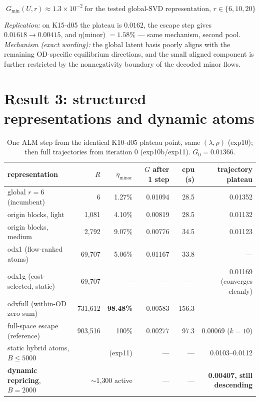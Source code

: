\documentclass[11pt]{article}
\begin{document}
\begin{equation}
\boxed{\;G_{\min}(U,r)\approx1.3\times10^{-2}\ \text{for the tested global-SVD
representation, }r\in\{6,10,20\}\;}
\label{eq:floor}
\end{equation}

\noindent\emph{Replication:} on K15-d05 the plateau is $0.0162$, the escape step gives
$0.01618\to0.00415$, and $\eta$(minor) $=1.58\%$ --- same mechanism, second pool.
\emph{Mechanism (exact wording):} the global latent basis poorly aligns with the
remaining OD-specific equilibrium directions, and the small aligned component is further
restricted by the nonnegativity boundary of the decoded minor flows.

\section{Result 3: structured representations and dynamic atoms}\label{sec:atoms}

\begin{table}[h]\centering\small
\caption{One ALM step from the identical K10-d05 plateau point, same $(\lambda,\rho)$
(exp10); then full trajectories from iteration 0 (exp10b/exp11). $G_0=0.01366$.}
\begin{tabular}{lrrrrr}
\toprule
representation & $R$ & $\eta_{\text{minor}}$ & $G$ after 1 step & cpu (s) & trajectory plateau\\
\midrule
global $r{=}6$ (incumbent) & 6 & 1.27\% & 0.01094 & 28.5 & 0.01352\\
origin blocks, light & 1{,}081 & 4.10\% & 0.00819 & 28.5 & 0.01132\\
origin blocks, medium & 2{,}792 & 9.07\% & 0.00776 & 34.5 & 0.01123\\
odx1 (flow-ranked atoms) & 69{,}707 & 5.06\% & 0.01167 & 33.8 & ---\\
odx1g (cost-selected, static) & 69{,}707 & --- & --- & --- & 0.01169 (converges cleanly)\\
odxfull (within-OD zero-sum) & 731{,}612 & \textbf{98.48\%} & 0.00583 & 156.3 & ---\\
full-space escape (reference) & 903{,}516 & 100\% & 0.00277 & 97.3 & 0.00069 ($k{=}10$)\\
\midrule
static hybrid atoms, $B{\le}5000$ & \multicolumn{2}{r}{(exp11)} & --- & --- & 0.0103--0.0112\\
\textbf{dynamic repricing}, $B{=}2000$ & \multicolumn{2}{r}{$\sim$1{,}300 active} & --- & --- &
\textbf{0.00407, still descending}\\
\bottomrule
\end{tabular}
\end{table}
\end{document}
